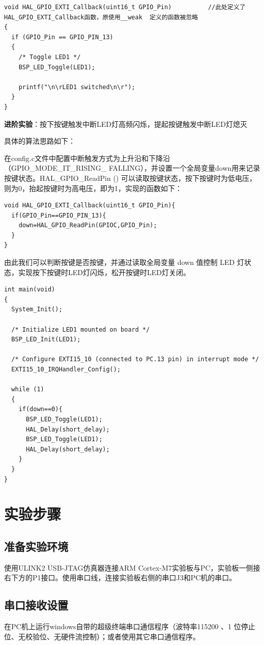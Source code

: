 ﻿\documentclass[UTF8,12pt]{article}
\begin{document}
\begin{lstlisting}[frame=shadowbox]
void HAL_GPIO_EXTI_Callback(uint16_t GPIO_Pin)			//此处定义了HAL_GPIO_EXTI_Callback函数，原使用__weak  定义的函数被忽略
{
  if (GPIO_Pin == GPIO_PIN_13)
  {
    /* Toggle LED1 */
    BSP_LED_Toggle(LED1);
    
    printf("\n\rLED1 switched\n\r");
  }
}
\end{lstlisting}

\noindent
\textbf{进阶实验}：按下按键触发中断LED灯高频闪烁，提起按键触发中断LED灯熄灭

具体的算法思路如下：

在config.c文件中配置中断触发方式为上升沿和下降沿（GPIO\_MODE\_IT\_RISING\_
FALLING），并设置一个全局变量down用来记录按键状态。HAL\_GPIO\_ReadPin () 可以读取按键状态，按下按键时为低电压，则为0，抬起按键时为高电压，即为1，实现的函数如下：

\begin{lstlisting}[frame=shadowbox]
void HAL_GPIO_EXTI_Callback(uint16_t GPIO_Pin){
  if(GPIO_Pin==GPIO_PIN_13){
    down=HAL_GPIO_ReadPin(GPIOC,GPIO_Pin);
  }
}
\end{lstlisting}
由此我们可以判断按键是否按键，并通过读取全局变量 down 值控制 LED 灯状态，实现按下按键时LED灯闪烁，松开按键时LED灯关闭。  

\begin{lstlisting}[frame=shadowbox]
int main(void)
{
  System_Init();
  
  /* Initialize LED1 mounted on board */
  BSP_LED_Init(LED1);
  
  /* Configure EXTI15_10 (connected to PC.13 pin) in interrupt mode */
  EXTI15_10_IRQHandler_Config();
  
  while (1)
  {
    if(down==0){
      BSP_LED_Toggle(LED1);
      HAL_Delay(short_delay);
      BSP_LED_Toggle(LED1);
      HAL_Delay(short_delay);
    }
  }
}
\end{lstlisting}

\section{实验步骤}

\subsection{准备实验环境}
使用ULINK2 USB-JTAG仿真器连接ARM Cortex-M7实验板与PC，实验板一侧接右下方的P1接口。使用串口线，连接实验板右侧的串口J3和PC机的串口。

\subsection{串口接收设置}
在PC机上运行windows自带的超级终端串口通信程序（波特率115200 、1 位停止位、无校验位、无硬件流控制）；或者使用其它串口通信程序。
\end{document}
